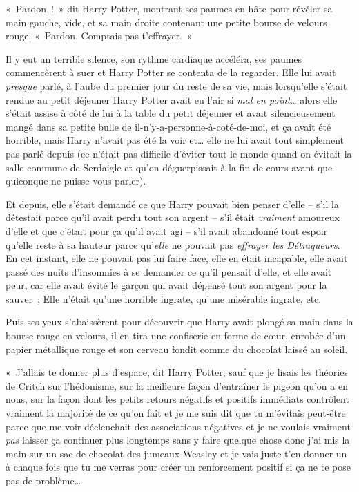 «~Pardon~!~» dit Harry Potter, montrant ses paumes en hâte pour révéler sa main gauche, vide, et sa main droite contenant une petite bourse de velours rouge. «~Pardon. Comptais pas t'effrayer.~»

Il y eut un terrible silence, son rythme cardiaque accéléra, ses paumes commencèrent à suer et Harry Potter se contenta de la regarder. Elle lui avait \emph{presque} parlé, à l'aube du premier jour du reste de sa vie, mais lorsqu'elle s'était rendue au petit déjeuner Harry Potter avait eu l'air si \emph{mal en point}… alors elle s'était assise à côté de lui à la table du petit déjeuner et avait silencieusement mangé dans sa petite bulle de il-n'y-a-personne-à-coté-de-moi, et ça avait été horrible, mais Harry n'avait pas été la voir et… elle ne lui avait tout simplement pas parlé depuis (ce n'était pas difficile d'éviter tout le monde quand on évitait la salle commune de Serdaigle et qu'on déguerpissait à la fin de cours avant que quiconque ne puisse vous parler).

Et depuis, elle s'était demandé ce que Harry pouvait bien penser d'elle -- s'il la détestait parce qu'il avait perdu tout son argent -- s'il était \emph{vraiment} amoureux d'elle et que c'était pour ça qu'il avait agi -- s'il avait abandonné tout espoir qu'elle reste à sa hauteur parce qu'\emph{elle} ne pouvait pas \emph{effrayer les Détraqueurs}. En cet instant, elle ne pouvait pas lui faire face, elle en était incapable, elle avait passé des nuits d'insomnies à se demander ce qu'il pensait d'elle, et elle avait peur, car elle avait évité le garçon qui avait dépensé tout son argent pour la sauver~; Elle n'était qu'une horrible ingrate, qu'une misérable ingrate, etc.

Puis ses yeux s'abaissèrent pour découvrir que Harry avait plongé sa main dans la bourse rouge en velours, il en tira une confiserie en forme de cœur, enrobée d'un papier métallique rouge et son cerveau fondit comme du chocolat laissé au soleil.

«~J'allais te donner plus d'espace, dit Harry Potter, sauf que je lisais les théories de Critch sur l'hédonisme, sur la meilleure façon d'entraîner le pigeon qu'on a en nous, sur la façon dont les petits retours négatifs et positifs immédiats contrôlent vraiment la majorité de ce qu'on fait et je me suis dit que tu m'évitais peut-être parce que me voir déclenchait des associations négatives et je ne voulais vraiment \emph{pas} laisser ça continuer plus longtemps sans y faire quelque chose donc j'ai mis la main sur un sac de chocolat des jumeaux Weasley et je vais juste t'en donner un à chaque fois que tu me verras pour créer un renforcement positif si ça ne te pose pas de problème…

